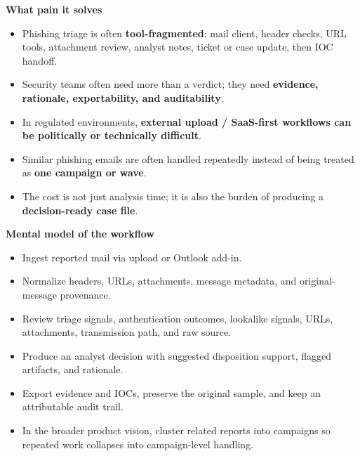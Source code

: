 \documentclass[10pt,a4paper]{article}
\begin{document}
\noindent\textbf{What pain it solves}
\begin{itemize}
  \item Phishing triage is often \textbf{tool-fragmented}: mail client, header checks, URL tools, attachment review, analyst notes, ticket or case update, then IOC handoff.
  \item Security teams often need more than a verdict; they need \textbf{evidence, rationale, exportability, and auditability}.
  \item In regulated environments, \textbf{external upload / SaaS-first workflows can be politically or technically difficult}.
  \item Similar phishing emails are often handled repeatedly instead of being treated as \textbf{one campaign or wave}.
  \item The cost is not just analysis time; it is also the burden of producing a \textbf{decision-ready case file}.
\end{itemize}

\noindent\textbf{Mental model of the workflow}
\begin{itemize}
  \item Ingest reported mail via upload or Outlook add-in.
  \item Normalize headers, URLs, attachments, message metadata, and original-message provenance.
  \item Review triage signals, authentication outcomes, lookalike signals, URLs, attachments, transmission path, and raw source.
  \item Produce an analyst decision with suggested disposition support, flagged artifacts, and rationale.
  \item Export evidence and IOCs, preserve the original sample, and keep an attributable audit trail.
  \item In the broader product vision, cluster related reports into campaigns so repeated work collapses into campaign-level handling.
\end{itemize}
\end{document}
